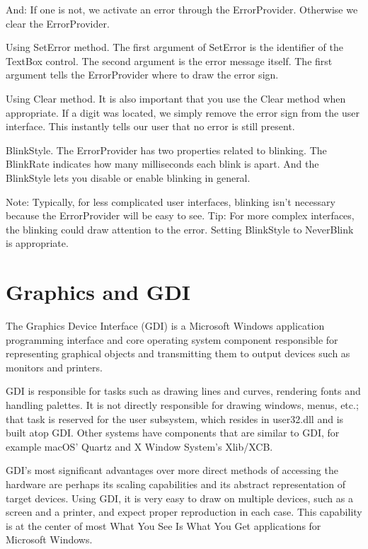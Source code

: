 And: If one is not, we activate an error through the ErrorProvider. Otherwise we clear the
ErrorProvider.





Using SetError method. The first argument of SetError is the identifier of the TextBox control.
The second argument is the error message itself. The first argument tells the ErrorProvider where to
draw the error sign.

Using Clear method. It is also important that you use the Clear method when appropriate. If a digit
was located, we simply remove the error sign from the user interface. This instantly tells our user
that no error is still present.

BlinkStyle. The ErrorProvider has two properties related to blinking. The BlinkRate indicates how
many milliseconds each blink is apart. And the BlinkStyle lets you disable or enable blinking in
general.

Note: Typically, for less complicated user interfaces, blinking isn't necessary because the
ErrorProvider will be easy to see.
Tip: For more complex interfaces, the blinking could draw attention to the error. Setting BlinkStyle
to NeverBlink is appropriate.
\section{Graphics and GDI}
The Graphics Device Interface (GDI) is a Microsoft Windows application programming interface
and core operating system component responsible for representing graphical objects and
transmitting them to output devices such as monitors and printers.

GDI is responsible for tasks such as drawing lines and curves, rendering fonts and handling palettes.
It is not directly responsible for drawing windows, menus, etc.; that task is reserved for the user
subsystem, which resides in user32.dll and is built atop GDI. Other systems have components that
are similar to GDI, for example macOS' Quartz and X Window System's Xlib/XCB.

GDI's most significant advantages over more direct methods of accessing the hardware are perhaps
its scaling capabilities and its abstract representation of target devices. Using GDI, it is very easy to
draw on multiple devices, such as a screen and a printer, and expect proper reproduction in each
case. This capability is at the center of most What You See Is What You Get applications for
Microsoft Windows.

